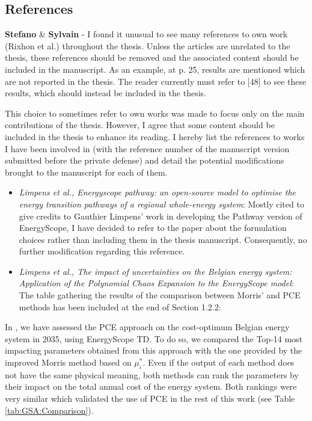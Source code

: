 \documentclass[12pt,a4paper]{article}
\begin{document}
\subsection{References}
\label{references}

\begin{mdframed}[style=comment] %
{\color{orange} \textbf{Stefano}} \& {\color{purple} \textbf{Sylvain}} - I found it unusual to see many references to own work (Rixhon et al.) throughout the thesis. Unless the articles are unrelated to the thesis, these references should be removed and the associated content should be included in the manuscript. As an example, at p. 25, results are mentioned which are not reported in the thesis. The reader currently must refer to [48] to see these results, which should instead be included in the thesis. 
\end{mdframed}

\noindent This choice to sometimes refer to own works was made to focus only on the main contributions of the thesis. However, I agree that some content should be included in the thesis to enhance its reading. I hereby list the references to works I have been involved in (with the reference number of the manuscript version submitted before the private defense) and detail the potential modifications brought to the manuscript for each of them.

\begin{itemize}
\item \emph{\cite{limpens2024pathway} Limpens et al., Energyscope pathway: an open-source model to optimise the energy transition pathways of a regional whole-energy system}: Mostly cited to give credits to Gauthier Limpens' work in developing the Pathway version of EnergyScope, I have decided to refer to the paper about the formulation choices rather than including them in the thesis manuscript. Consequently, no further modification regarding this reference.
\item \emph{\cite{limpens2020impact} Limpens et al., The impact of uncertainties on the Belgian energy system: Application of the Polynomial Chaos Expansion to the EnergyScope model}: The table gathering the results of the comparison between Morris' and PCE methods has been included {\color{blue}at the end of Section 1.2.2}:
\end{itemize} 

\begin{mdframed}[style=manuscript] %
In \cite{limpens2020impact}, we have assessed the PCE approach on the cost-optimum Belgian energy system in 2035, using EnergyScope TD. To do so, we compared the Top-14 most impacting parameters obtained from this approach with the one provided by the improved Morris method based on $\mu^*_{i}$. Even if the output of each method does not have the same physical meaning, both methods can rank the parameters by their impact on the total annual cost of the energy system. Both rankings were very similar which validated the use of PCE in the rest of this work (see Table \ref{tab:GSA:Comparison}).
\end{mdframed}
\end{document}
